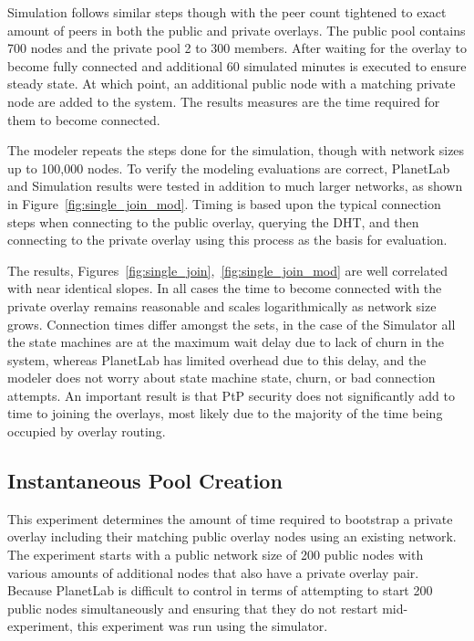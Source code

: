 Simulation follows similar steps though with the peer count tightened to exact
amount of peers in both the public and private overlays.  The public pool
contains 700 nodes and the private pool 2 to 300 members.  After waiting for
the overlay to become fully connected and additional 60 simulated minutes is
executed to ensure steady state.  At which point, an additional public node
with a matching private node are added to the system.  The results measures are
the time required for them to become connected.

The modeler repeats the steps done for the simulation, though with network
sizes up to 100,000 nodes.  To verify the modeling evaluations are correct,
PlanetLab and Simulation results were tested in addition to much larger
networks, as shown in Figure~\ref{fig:single_join_mod}.  Timing is based upon
the typical connection steps when connecting to the public overlay, querying
the DHT, and then connecting to the private overlay using this process as the
basis for evaluation.

The results, Figures~\ref{fig:single_join},~\ref{fig:single_join_mod} are well
correlated with near identical slopes.  In all cases the time to become
connected with the private overlay remains reasonable and scales logarithmically
as network size grows.  Connection times differ amongst the sets, in the case of
the Simulator all the state machines are at the maximum wait delay due to lack
of churn in the system, whereas PlanetLab has limited overhead due to this
delay, and the modeler does not worry about state machine state, churn, or bad
connection attempts.  An important result is that PtP security does not
significantly add to time to joining the overlays, most likely due to the
majority of the time being occupied by overlay routing.

\subsection{Instantaneous Pool Creation}
\label{mass_join}
This experiment determines the amount of time required to bootstrap a private
overlay including their matching public overlay nodes using an existing network.
The experiment starts with a public network size of 200 public nodes with
various amounts of additional nodes that also have a private overlay pair.
Because PlanetLab is difficult to control in terms of attempting to start 200
public nodes simultaneously and ensuring that they do not restart
mid-experiment, this experiment was run using the simulator.  

